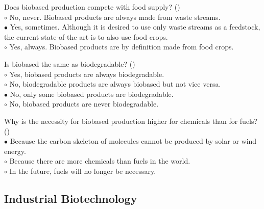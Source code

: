 \documentclass[]{beamer}
\begin{document}
\begin{CJK}{UTF8}{gbsn}
\begin{frame}[shrink] {} 
\addtocounter{answers}{1}
\color{blue}
  Does biobased production compete with food supply?
 ({})\\
\color{black}
\setlength{\parindent}{-0.4cm}
{\color{red}$\circ$} No, never. Biobased products are always made from waste streams.  \\
{\color{red}$\bullet$} Yes, sometimes. Although it is desired to use only waste streams as a feedstock, the current state-of-the art is to also use food crops.  \\
{\color{red}$\circ$} Yes, always. Biobased products are by definition made from food crops.  \\
\end{frame}


\begin{frame}[shrink] {} 
\addtocounter{answers}{1}
\color{blue}
  Is biobased the same as biodegradable?
 ({})\\
\color{black}
\setlength{\parindent}{-0.4cm}
{\color{red}$\circ$} Yes, biobased products are always biodegradable.  \\
{\color{red}$\circ$} No, biodegradable products are always biobased but not vice versa.  \\
{\color{red}$\bullet$} No, only some biobased products are biodegradable.  \\
{\color{red}$\circ$} No, biobased products are never biodegradable.  \\
\end{frame}


\begin{frame}[shrink] {} 
\addtocounter{answers}{1}
\color{blue}
  Why is the necessity for biobased production higher for chemicals than for fuels? 
 ({})\\
\color{black}
\setlength{\parindent}{-0.4cm}
{\color{red}$\bullet$} Because the carbon skeleton of molecules cannot be produced by solar or wind energy.   \\
{\color{red}$\circ$} Because there are more chemicals than fuels in the world.  \\
{\color{red}$\circ$} In the future, fuels will no longer be necessary.   \\
\end{frame}


\subsection{ Industrial Biotechnology}
\setcounter{answers}{0}



\end{CJK}
\end{document}
